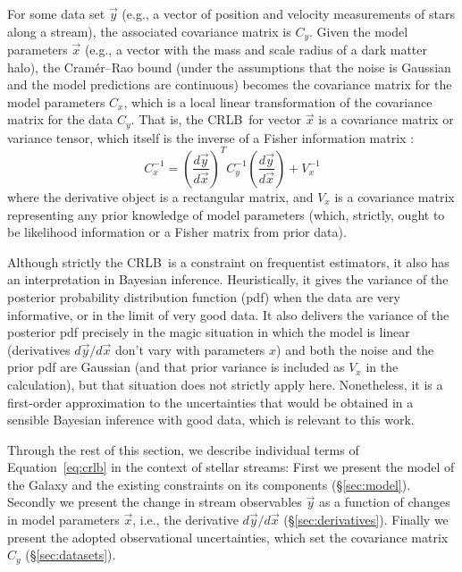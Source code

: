 \documentclass[modern]{aastex62}
\newcommand{\acronym}[1]{{\small{#1}}}
\newcommand{\CRLB}{\acronym{CRLB}}
\begin{document}
For some data set $\vec{y}$ (e.g., a vector of position and velocity measurements of stars along a stream), the associated covariance matrix is $C_y$.
Given the model parameters $\vec{x}$ (e.g., a vector with the mass and scale radius of a dark matter halo), the Cram\' er--Rao bound (under the assumptions that the noise is Gaussian and the model predictions are continuous) becomes the covariance matrix for the model parameters $C_x$, which is a local linear transformation of the covariance matrix for the data $C_y$.
That is, the \CRLB\ for vector $\vec{x}$ is a covariance matrix or variance tensor, which itself is the inverse of a Fisher information matrix \citep{fisher}:
\begin{equation}
C_x^{-1} = \left(\frac{d\vec{y}}{d\vec{x}}\right)^{T} C_y^{-1} \left(\frac{d\vec{y}}{d\vec{x}}\right) + V_x^{-1}
\label{eq:crlb}
\end{equation}
where the derivative object is a rectangular matrix, and $V_x$ is a covariance matrix representing any prior knowledge of model parameters (which, strictly, ought to be likelihood information or a Fisher matrix from prior data).

Although strictly the \CRLB\ is a constraint on frequentist estimators, it also has an interpretation in Bayesian inference.
Heuristically, it gives the variance of the posterior probability distribution function (pdf) when the data are very informative, or in the limit of very good data.
It also delivers the variance of the posterior pdf precisely in the magic situation in which the model is linear (derivatives $d\vec{y}/d\vec{x}$ don't vary with parameters $x$) and both the noise and the prior pdf are Gaussian (and that prior variance is included as $V_x$ in the calculation), but that situation does not strictly apply here.
Nonetheless, it is a first-order approximation to the uncertainties that would be obtained in a sensible Bayesian inference with good data, which is relevant to this work.

Through the rest of this section, we describe individual terms of Equation~\ref{eq:crlb} in the context of stellar streams:
First we present the model of the Galaxy and the existing constraints on its components (\S\ref{sec:model}).
Secondly we present the change in stream observables $\vec{y}$ as a function of changes in model parameters $\vec{x}$, i.e., the derivative $d\vec{y}/d\vec{x}$ (\S\ref{sec:derivatives}).
Finally we present the adopted observational uncertainties, which set the covariance matrix $C_y$ (\S\ref{sec:datasets}).
\end{document}
